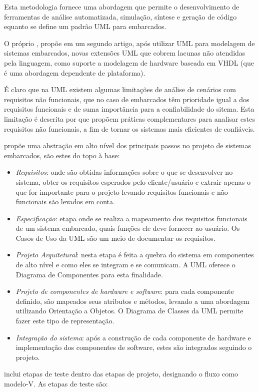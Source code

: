 Esta metodologia fornece uma abordagem que permite o desenvolvimento de ferramentas de análise automatizada, simulação, síntese e geração de código equanto se define um padrão UML para embarcados.

O próprio \textcite{Martin:2001}, propõe em um segundo artigo, após utilizar UML para modelagem de sistemas embarcados, novas extensões UML que cobrem lacunas não atendidas pela linguagem, como suporte a modelagem de hardware baseada em VHDL (que é uma abordagem dependente de plataforma).

É claro que na UML existem algumas limitações de análise de cenários com requisitos não funcionais, que no caso de embarcados têm prioridade igual a dos requisitos funcionais e de suma importância para a confiabilidade do sitema. Esta limitação é descrita por \textcite{Espinoza:2008} que propõem práticas complementares para analisar estes requisitos não funcionais, a fim de tornar os sistemas mais eficientes de confiáveis.

\textcite{Wolf:2001} propõe uma abstração em alto nível dos principais passos no projeto de sistemas embarcados, são estes do topo à base:

\begin{itemize}
	\item \emph{Requisitos}: onde são obtidas informações sobre o que se desenvolver no sistema, obter os requisitos esperados pelo cliente/usuário e extrair apenas o que for importante para o projeto levando requisitos funcionais e não funcionais são levados em conta.
	\item \emph{Especificação}: etapa onde se realiza a mapeamento dos requisitos funcionais de um sistema embarcado, quais funções ele deve fornecer ao usuário. Os Casos de Uso da UML são um meio de documentar os requisitos.
	\item \emph{Projeto Arquitetural}: nesta etapa é feita a quebra do sistema em componentes de alto nível e como eles se integram e se comunicam. A UML oferece o Diagrama de Componentes para esta finalidade.
	\item \emph{Projeto de componentes de hardware e software}: para cada componente definido, são mapeados seus atributos e métodos, levando a uma abordagem utilizando Orientação a Objetos. O Diagrama de Classes da UML permite fazer este tipo de representação.
	 \item \emph{Integração do sistema}: após a construção de cada componente de hardware e implementação dos componentes de software, estes são integrados seguindo o projeto.
\end{itemize}
\textcite{Marwedel:2001}  inclui etapas de teste dentro das etapas de projeto, designando o fluxo como modelo-V. As etapas de teste são: 

